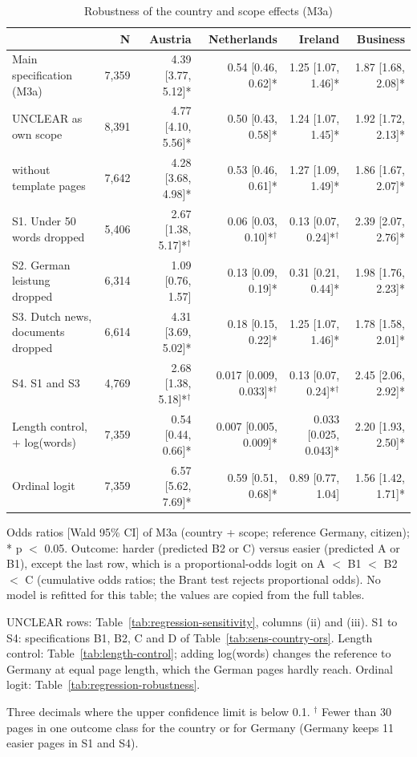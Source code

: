 \begin{table}[htbp]
\centering
\scriptsize\setlength{\tabcolsep}{3pt}
\begin{threeparttable}
\caption{Robustness of the country and scope effects (M3a)}
\label{tab:robustness-overview}
\begin{tabular}{lrrrrr}
\hline
 & N & Austria & Netherlands & Ireland & Business \\
\hline
Main specification (M3a) & 7,359 & 4.39 [3.77, 5.12]* & 0.54 [0.46, 0.62]* & 1.25 [1.07, 1.46]* & 1.87 [1.68, 2.08]* \\
\hline
UNCLEAR as own scope & 8,391 & 4.77 [4.10, 5.56]* & 0.50 [0.43, 0.58]* & 1.24 [1.07, 1.45]* & 1.92 [1.72, 2.13]* \\
\quad without template pages & 7,642 & 4.28 [3.68, 4.98]* & 0.53 [0.46, 0.61]* & 1.27 [1.09, 1.49]* & 1.86 [1.67, 2.07]* \\
\hline
S1. Under 50 words dropped & 5,406 & 2.67 [1.38, 5.17]*$^\dagger$ & 0.06 [0.03, 0.10]*$^\dagger$ & 0.13 [0.07, 0.24]*$^\dagger$ & 2.39 [2.07, 2.76]* \\
S2. German leistung dropped & 6,314 & 1.09 [0.76, 1.57] & 0.13 [0.09, 0.19]* & 0.31 [0.21, 0.44]* & 1.98 [1.76, 2.23]* \\
S3. Dutch news, documents dropped & 6,614 & 4.31 [3.69, 5.02]* & 0.18 [0.15, 0.22]* & 1.25 [1.07, 1.46]* & 1.78 [1.58, 2.01]* \\
S4. S1 and S3 & 4,769 & 2.68 [1.38, 5.18]*$^\dagger$ & 0.017 [0.009, 0.033]*$^\dagger$ & 0.13 [0.07, 0.24]*$^\dagger$ & 2.45 [2.06, 2.92]* \\
\hline
Length control, + log(words) & 7,359 & 0.54 [0.44, 0.66]* & 0.007 [0.005, 0.009]* & 0.033 [0.025, 0.043]* & 2.20 [1.93, 2.50]* \\
Ordinal logit & 7,359 & 6.57 [5.62, 7.69]* & 0.59 [0.51, 0.68]* & 0.89 [0.77, 1.04] & 1.56 [1.42, 1.71]* \\
\hline
\end{tabular}
\begin{tablenotes}
\footnotesize
\item Odds ratios [Wald 95\% CI] of M3a (country + scope; reference Germany, citizen); * p $<$ 0.05. Outcome: harder (predicted B2 or C) versus easier (predicted A or B1), except the last row, which is a proportional-odds logit on A $<$ B1 $<$ B2 $<$ C (cumulative odds ratios; the Brant test rejects proportional odds). No model is refitted for this table; the values are copied from the full tables.
\item UNCLEAR rows: Table~\ref{tab:regression-sensitivity}, columns (ii) and (iii). S1 to S4: specifications B1, B2, C and D of Table~\ref{tab:sens-country-ors}. Length control: Table~\ref{tab:length-control}; adding log(words) changes the reference to Germany at equal page length, which the German pages hardly reach. Ordinal logit: Table~\ref{tab:regression-robustness}.
\item Three decimals where the upper confidence limit is below 0.1. $^\dagger$ Fewer than 30 pages in one outcome class for the country or for Germany (Germany keeps 11 easier pages in S1 and S4).
\end{tablenotes}
\end{threeparttable}
\end{table}
